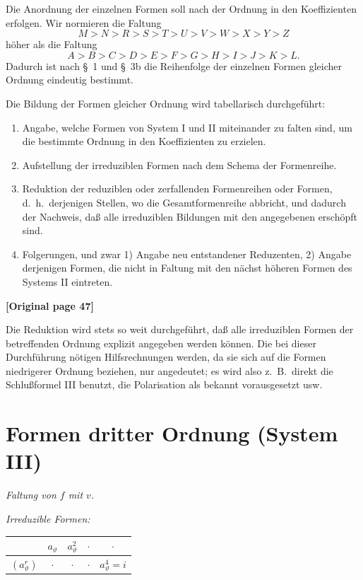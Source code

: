\documentclass[12pt,a4paper]{article}
\begin{document}
Die Anordnung der einzelnen Formen soll nach der Ordnung in den Koeffizienten erfolgen. Wir normieren die Faltung
\[M > N > R > S > T > U > V > W > X > Y > Z\]
höher als die Faltung
\[A > B > C > D > E > F > G > H > I > J > K > L.\]
Dadurch ist nach \S\ 1 und \S\ 3b die Reihenfolge der einzelnen Formen gleicher Ordnung eindeutig bestimmt.

Die Bildung der Formen gleicher Ordnung wird tabellarisch durchgeführt:
\begin{enumerate}
\item[I.] Angabe, welche Formen von System I und II miteinander zu falten sind, um die bestimmte Ordnung in den Koeffizienten zu erzielen.
\item[II.] Aufstellung der irreduziblen Formen nach dem Schema der Formenreihe.
\item[III.] Reduktion der reduziblen oder zerfallenden Formenreihen oder Formen, d.\ h.\ derjenigen Stellen, wo die Gesamtformenreihe abbricht, und dadurch der Nachweis, daß alle irreduziblen Bildungen mit den angegebenen erschöpft sind.
\item[IV.] Folgerungen, und zwar 1) Angabe neu entstandener Reduzenten, 2) Angabe derjenigen Formen, die nicht in Faltung mit den nächst höheren Formen des Systems II eintreten.
\end{enumerate}

\noindent\textbf{[Original page 47]}

Die Reduktion wird stets so weit durchgeführt, daß alle irreduziblen Formen der betreffenden Ordnung explizit angegeben werden können. Die bei dieser Durchführung nötigen Hilfsrechnungen werden, da sie sich auf die Formen niedrigerer Ordnung beziehen, nur angedeutet; es wird also z.\ B.\ direkt die Schlußformel III benutzt, die Polarisation als bekannt vorausgesetzt usw.

\section{Formen dritter Ordnung (System III)}

\textit{Faltung von $f$ mit $v$.}

\textit{Irreduzible Formen:}
\begin{center}
\begin{tabular}{c|cccc}
& $a_\vartheta$ & $a_\vartheta^2$ & $\cdot$ & $\cdot$ \\
\hline
$(a_\vartheta^r)$ & $\cdot$ & $\cdot$ & $\cdot$ & $a_\vartheta^4 = i$
\end{tabular}
\end{center}
\end{document}
